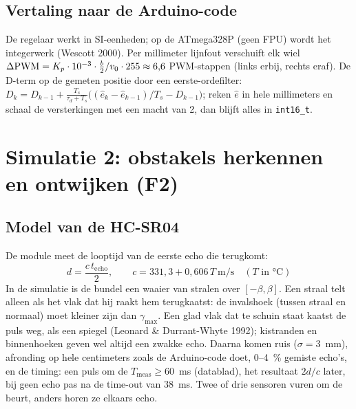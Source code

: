 \documentclass[10pt,a4paper]{article}
\begin{document}
\subsection{Vertaling naar de Arduino-code}
De regelaar werkt in SI-eenheden; op de ATmega328P (geen FPU) wordt het integerwerk (Wescott 2000).
Per millimeter lijnfout verschuift elk wiel
$\Delta\text{PWM} = K_p \cdot 10^{-3} \cdot \tfrac{b}{2} / v_0 \cdot 255 \approx 6{,}6$
PWM-stappen (links erbij, rechts eraf). De D-term op de gemeten positie door een eerste-ordefilter:
$D_k = D_{k-1} + \frac{T_s}{\tau_d + T_s}\bigl((\hat e_k - \hat e_{k-1})/T_s - D_{k-1}\bigr)$; reken
$\hat e$ in hele millimeters en schaal de versterkingen met een macht van 2, dan blijft alles in
\texttt{int16\_t}.

\section{Simulatie 2: obstakels herkennen en ontwijken (F2)}

\subsection{Model van de HC-SR04}
De module meet de looptijd van de eerste echo die terugkomt:
\begin{equation}
d = \frac{c\, t_{\text{echo}}}{2},\qquad c = 331{,}3 + 0{,}606\,T~\text{m/s}\quad (T\text{ in °C})
\label{eq:echo}
\end{equation}
In de simulatie is de bundel een waaier van stralen over $[-\beta, \beta]$. Een straal telt alleen als
het vlak dat hij raakt hem terugkaatst: de invalshoek (tussen straal en normaal) moet kleiner zijn dan
$\gamma_{\max}$. Een glad vlak dat te schuin staat kaatst de puls weg, als een spiegel
(Leonard \& Durrant-Whyte 1992); kistranden en binnenhoeken geven wel altijd een zwakke echo. Daarna
komen ruis ($\sigma = 3$~mm), afronding op hele centimeters zoals de Arduino-code doet, 0--4~\% gemiste
echo's, en de timing: een puls om de $T_{\text{meas}} \ge 60$~ms (datablad), het resultaat
$2d/c$ later, bij geen echo pas na de time-out van 38~ms. Twee of drie sensoren vuren om de beurt,
anders horen ze elkaars echo.
\end{document}
